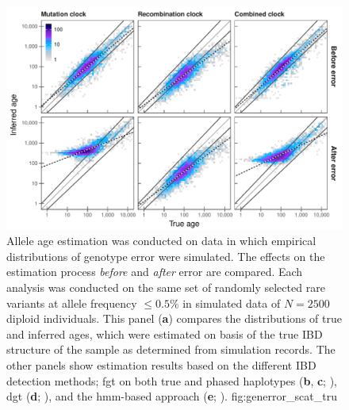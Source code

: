 

\begin{figure}[!htb]
{\,\small{}} \\
\includegraphics[width=\textwidth]{./img/ch5/generror_scat_tru}
{Allele age estimation was conducted on data in which empirical distributions of genotype error were simulated.
The effects on the estimation process \emph{before} and \emph{after} error are compared.
Each analysis was conducted on the same set of  randomly selected rare variants at allele frequency ${\leq 0.5\%}$ in simulated data of ${N=\num{2500}}$ diploid individuals.
This panel (\textbf{a}) compares the distributions of true and inferred ages, which were estimated on basis of the true IBD structure of the sample as determined from simulation records.
The other panels show estimation results based on the different IBD detection methods;
\gls{fgt} on both true and phased haplotypes (\textbf{b}, \textbf{c}; ),
\gls{dgt} (\textbf{d}; ),
and the \gls{hmm}-based approach (\textbf{e}; ).}
{fig:generror_scat_tru}
\end{figure}


